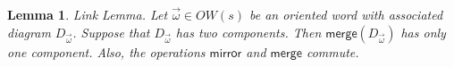 \documentclass[12pt]{amsart}
\newtheorem{lemma}[theorem]{Lemma}
\theoremstyle{definition}
\theoremstyle{remark}
\numberwithin{equation}{section}
\newcommand{\mirror}{\textsf{mirror}}
\newcommand{\merge}{\textsf{merge}}
\begin{document}
\begin{lemma}
\label{lem:link} \emph{Link Lemma.  } Let $\vec{\omega}\in OW(s)$ be an oriented word with associated diagram $D_{\vec{\omega}}$. Suppose that $D_{\vec{\omega}}$ has two components. Then $\merge(D_{\vec{\omega}})$ has only one component. Also, the operations $\mirror$ and $\merge$ commute.

\end{lemma}

\end{document}
